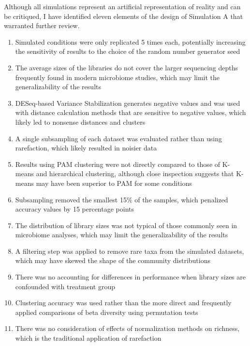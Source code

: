 \documentclass[
]{article}
\providecommand{\tightlist}{%
  \setlength{\itemsep}{0pt}\setlength{\parskip}{0pt}}
\begin{document}
Although all simulations represent an artificial representation of
reality and can be critiqued, I have identified eleven elements of the
design of Simulation A that warranted further review.

\begin{enumerate}
\def\labelenumi{\arabic{enumi}.}
\tightlist
\item
  Simulated conditions were only replicated 5 times each, potentially
  increasing the sensitivity of results to the choice of the random
  number generator seed
\item
  The average sizes of the libraries do not cover the larger sequencing
  depths frequently found in modern microbiome studies, which may limit
  the generalizability of the results
\item
  DESeq-based Variance Stabilization generates negative values and was
  used with distance calculation methods that are sensitive to negative
  values, which likely led to nonsense distances and clusters
\item
  A single subsampling of each dataset was evaluated rather than using
  rarefaction, which likely resulted in noisier data
\item
  Results using PAM clustering were not directly compared to those of
  K-means and hierarchical clustering, although close inspection
  suggests that K-means may have been superior to PAM for some
  conditions
\item
  Subsampling removed the smallest 15\% of the samples, which penalized
  accuracy values by 15 percentage points
\item
  The distribution of library sizes was not typical of those commonly
  seen in microbiome analyses, which may limit the generalizability of
  the results
\item
  A filtering step was applied to remove rare taxa from the simulated
  datasets, which may have skewed the shape of the community
  distributions
\item
  There was no accounting for differences in performance when library
  sizes are confounded with treatment group
\item
  Clustering accuracy was used rather than the more direct and
  frequently applied comparisons of beta diversity using permutation
  tests
\item
  There was no consideration of effects of normalization methods on
  richness, which is the traditional application of rarefaction
\end{enumerate}
\end{document}
